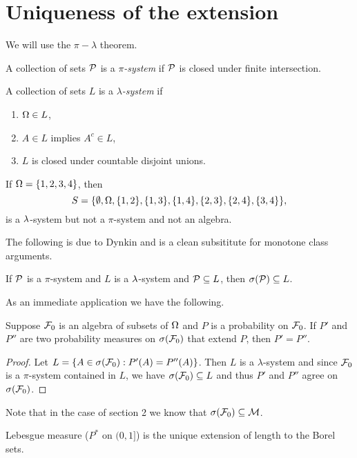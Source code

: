 \section{Uniqueness of the extension}
We will use the $\pi-\lambda$ theorem.
\begin{defn}
    A collection of sets ${\mathcal{P}}$ is a \emph{$\pi$-system} if ${\mathcal{P}}$ is closed under finite intersection.
\end{defn}

\begin{defn}
    A collection of sets $L$ is a \emph{$\lambda$-system} if
    \begin{enumerate}
        \item ${{\Omega}} \in L$,
        \item $A \in L$ implies $A^c \in L$,
        \item $L$ is closed under countable disjoint unions.
    \end{enumerate}
\end{defn}
\begin{ex}
    If ${{\Omega}} = \{1,2,3,4\}$, then 
    \[S = \{\emptyset, {{\Omega}}, \{1,2\}, \{1,3\}, \{1,4\}, \{2,3\}, \{2,4\}, \{3,4\} \},\]
    is a $\lambda$-system but not a $\pi$-system and not an algebra.
\end{ex}
The following is due to Dynkin and is a clean subsititute for monotone class arguments.
\begin{thrm}
    If ${\mathcal{P}}$ is a $\pi$-system and $L$ is a $\lambda$-system and ${\mathcal{P}} \subseteq L$, then $\sigma({\mathcal{P}}) \subseteq L$.
\end{thrm}
As an immediate application we have the following.
\begin{prop}
    Suppose ${\mathcal{F}}_0$ is an algebra of subsets of ${{\Omega}}$ and $P$ is a probability on ${\mathcal{F}}_0$. If $P'$ and $P''$ are two probability measures on $\sigma({\mathcal{F}}_0)$ that extend $P$, then $P' = P''$.
\end{prop}
\begin{proof}
    Let $L = \{A \in \sigma({\mathcal{F}}_0) : P'(A) = P''(A)\}$. Then $L$ is a $\lambda$-system and since ${\mathcal{F}}_0$ is a $\pi$-system contained in $L$, we have $\sigma({\mathcal{F}}_0) \subseteq L$ and thus $P'$ and $P''$ agree on $\sigma({\mathcal{F}}_0)$.
\end{proof}
Note that in the case of section 2 we know that $\sigma({\mathcal{F}}_0) \subseteq {\mathcal{M}}$. 

\begin{cor}
    Lebesgue measure ($P^*$ on $(0,1]$) is the unique extension of length to the Borel sets.
\end{cor}

